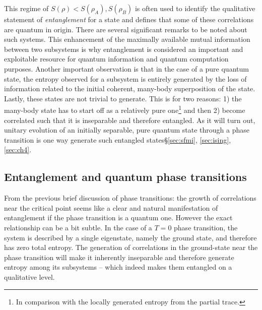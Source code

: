 This regime of $S(\rho) <  S(\rho_A), S(\rho_B)$ is often used to identify the qualitative statement of \emph{entanglement} for a state and defines that some of these correlations are quantum in origin. There are several significant remarks to be noted about such systems. This enhancement of the maximally available mutual information between two subsystems is why entanglement is considered an important and exploitable resource for quantum information and quantum computation purposes\cite{nielsen2010}. Another important observation is that in the case of a pure quantum state, the entropy observed for a subsystem is entirely generated by the loss of information related to the initial coherent, many-body superposition of the state. Lastly, these states are not trivial to generate. This is for two reasons: 1) the many-body state has to start off as a relatively pure one\footnote{In comparison with the locally generated entropy from the partial trace.} and then 2) become correlated such that it is inseparable and therefore entangled. As it will turn out, unitary evolution of an initially separable, pure quantum state through a phase transition is one way generate such entangled states\S \ref{sec:sfmi}, \ref{sec:ising}, \ref{sec:ch4}.

\subsection{Entanglement and quantum phase transitions}

From the previous brief discussion of phase transitions: the growth of correlations near the critical point seems like a clear and natural manifestation of entanglement if the phase transition is a quantum one. However the exact relationship can be a bit subtle. In the case of a $T=0$ phase transition, the system is described by a single eigenstate, namely the ground state, and therefore has zero total entropy. The generation of correlations in the ground-state near the phase transition will make it inherently inseparable and therefore generate entropy among its subsystems -- which indeed makes them entangled on a qualitative level\cite{Vidal2003,Amico2008,Sachdev2011}. 

